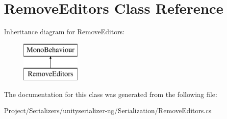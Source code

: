 \hypertarget{class_remove_editors}{}\section{Remove\+Editors Class Reference}
\label{class_remove_editors}
Inheritance diagram for Remove\+Editors\+:\begin{figure}[H]
\begin{center}
\leavevmode
\includegraphics[height=2.000000cm]{class_remove_editors}
\end{center}
\end{figure}


The documentation for this class was generated from the following file\+:\begin{DoxyCompactItemize}
\item 
Project/\+Serializers/unityserializer-\/ng/\+Serialization/Remove\+Editors.\+cs\end{DoxyCompactItemize}
